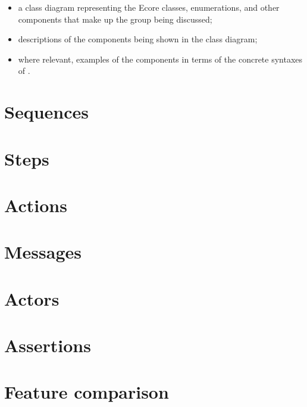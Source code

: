\begin{itemize}
\item
	a class diagram representing the Ecore classes, enumerations, and other
	components that make up the group being discussed;
\item
	descriptions of the components being shown in the class diagram;
\item
	where relevant, examples of the components in terms of the concrete
	syntaxes of \langname.
\end{itemize}

\section{Sequences}\label{sec:metamodel-sequences}


\section{Steps}\label{sec:metamodel-steps}


\section{Actions}\label{sec:metamodel-actions}


\section{Messages}\label{sec:metamodel-messages}


\section{Actors}\label{sec:metamodel-actors}


\section{Assertions}\label{sec:metamodel-assertions}


\section{Feature comparison}\label{sec:metamodel-features}


